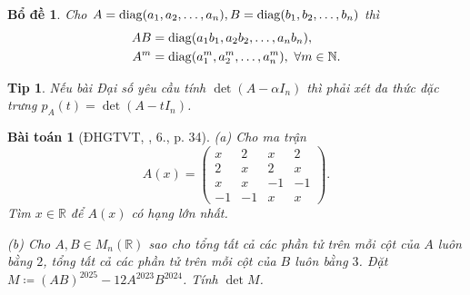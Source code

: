 \documentclass{article}
\newtheorem{baitoan}{Bài toán}
\newtheorem{bode}{Bổ đề}
\newtheorem{tip}{Tip}
\begin{document}
\begin{bode}
	Cho $A = {\rm diag}(a_1,a_2,\ldots,a_n),B = {\rm diag}(b_1,b_2,\ldots,b_n)$ thì
	\begin{align*}
		AB &= {\rm diag}(a_1b_1,a_2b_2,\ldots,a_nb_n),\\
		A^m &= {\rm diag}(a_1^m,a_2^m,\ldots,a_n^m),\ \forall m\in\mathbb{N}.
	\end{align*}
\end{bode}

\begin{tip}
	Nếu bài Đại số yêu cầu tính $\det(A - \alpha I_n)$ thì phải xét đa thức đặc trưng $p_A(t) = \det(A - tI_n)$.
\end{tip}

\begin{baitoan}[ĐHGTVT, \cite{VMS_VMC2025}, 6., p. 34]
	(a) Cho ma trận
	\begin{equation*}
		A(x) = \begin{pmatrix}
			x & 2 & x & 2\\2 & x & 2 & x\\ x & x & -1 & -1\\-1 & -1 & x & x
		\end{pmatrix}.
	\end{equation*}
	Tìm $x\in\mathbb{R}$ để $A(x)$ có hạng lớn nhất.
	\item(b) Cho $A,B\in M_n(\mathbb{R})$ sao cho tổng tất cả các phần tử trên mỗi cột của $A$ luôn bằng $2$, tổng tất cả các phần tử trên mỗi cột của $B$ luôn bằng $3$. Đặt $M\coloneqq(AB)^{2025} - 12A^{2023}B^{2024}$. Tính $\det M$.
\end{baitoan}
\end{document}
